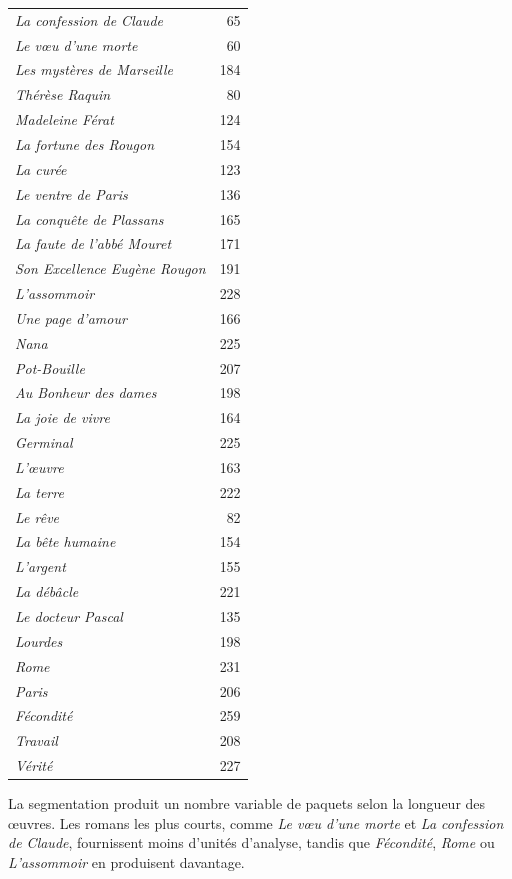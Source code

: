 \begin{longtable}{p{8cm}r}
\textit{La confession de Claude} & 65 \\
\textit{Le vœu d'une morte} & 60 \\
\textit{Les mystères de Marseille} & 184 \\
\textit{Thérèse Raquin} & 80 \\
\textit{Madeleine Férat} & 124 \\
\textit{La fortune des Rougon} & 154 \\
\textit{La curée} & 123 \\
\textit{Le ventre de Paris} & 136 \\
\textit{La conquête de Plassans} & 165 \\
\textit{La faute de l'abbé Mouret} & 171 \\
\textit{Son Excellence Eugène Rougon} & 191 \\
\textit{L'assommoir} & 228 \\
\textit{Une page d'amour} & 166 \\
\textit{Nana} & 225 \\
\textit{Pot-Bouille} & 207 \\
\textit{Au Bonheur des dames} & 198 \\
\textit{La joie de vivre} & 164 \\
\textit{Germinal} & 225 \\
\textit{L'œuvre} & 163 \\
\textit{La terre} & 222 \\
\textit{Le rêve} & 82 \\
\textit{La bête humaine} & 154 \\
\textit{L'argent} & 155 \\
\textit{La débâcle} & 221 \\
\textit{Le docteur Pascal} & 135 \\
\textit{Lourdes} & 198 \\
\textit{Rome} & 231 \\
\textit{Paris} & 206 \\
\textit{Fécondité} & 259 \\
\textit{Travail} & 208 \\
\textit{Vérité} & 227 \\

\bottomrule
\end{longtable}

La segmentation produit un nombre variable de paquets selon la longueur des œuvres. Les romans les plus courts, comme \textit{Le vœu d'une morte} et \textit{La confession de Claude}, fournissent moins d'unités d'analyse, tandis que \textit{Fécondité}, \textit{Rome} ou \textit{L'assommoir} en produisent davantage.

